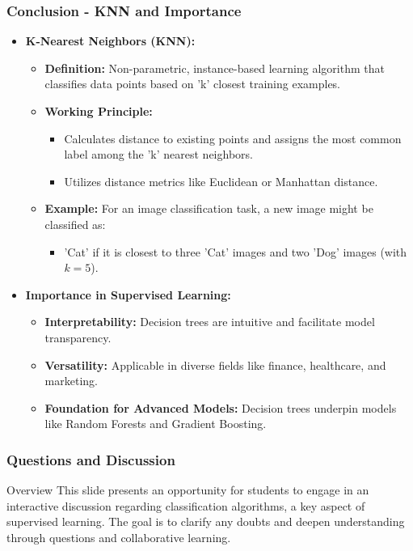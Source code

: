\documentclass[aspectratio=169]{beamer}
\begin{document}
\begin{frame}[fragile]
    \frametitle{Conclusion - KNN and Importance}
    \begin{itemize}
        \item \textbf{K-Nearest Neighbors (KNN):}
        \begin{itemize}
            \item \textbf{Definition:} Non-parametric, instance-based learning algorithm that classifies data points based on 'k' closest training examples.
            \item \textbf{Working Principle:}
            \begin{itemize}
                \item Calculates distance to existing points and assigns the most common label among the 'k' nearest neighbors.
                \item Utilizes distance metrics like Euclidean or Manhattan distance.
            \end{itemize}
            \item \textbf{Example:} For an image classification task, a new image might be classified as:
            \begin{itemize}
                \item 'Cat' if it is closest to three 'Cat' images and two 'Dog' images (with $k=5$).
            \end{itemize}
        \end{itemize}
        
        \item \textbf{Importance in Supervised Learning:}
        \begin{itemize}
            \item \textbf{Interpretability:} Decision trees are intuitive and facilitate model transparency.
            \item \textbf{Versatility:} Applicable in diverse fields like finance, healthcare, and marketing.
            \item \textbf{Foundation for Advanced Models:} Decision trees underpin models like Random Forests and Gradient Boosting.
        \end{itemize}
    \end{itemize}
\end{frame}

\begin{frame}[fragile]
    \frametitle{Questions and Discussion}
    \begin{block}{Overview}
        This slide presents an opportunity for students to engage in an interactive discussion regarding classification algorithms, a key aspect of supervised learning. The goal is to clarify any doubts and deepen understanding through questions and collaborative learning.
    \end{block}
\end{frame}
\end{document}
